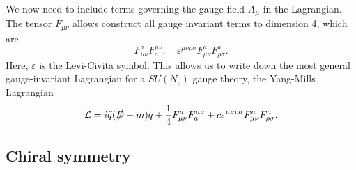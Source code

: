 We now need to include terms governing the gauge field $A_\mu$ in the Lagrangian.
The tensor $F_{\mu\nu}$ allows construct all gauge invariant terms to dimension 4, which are
\begin{equation}
    F_{\mu \nu}^a F_a^{\mu \nu}, 
    \quad 
    \varepsilon^{\mu\nu\rho\sigma} F_{\mu \nu}^a F_{\rho \sigma}^a.
\end{equation}
Here, $\varepsilon$ is the Levi-Civita symbol.
This allows us to write down the most general gauge-invariant Lagrangian for a $SU(N_c)$ gauge theory, the Yang-Mills Lagrangian
\begin{equation}
    \mathcal{L} = i  \bar q (\slashed{D} - m)q 
    + \frac{1}{4} F_{\mu \nu}^a F_a^{\mu \nu}
    + c \varepsilon^{\mu\nu\rho\sigma} F_{\mu \nu}^a F_{\rho \sigma}^a.
\end{equation}

\subsection*{Chiral symmetry}


